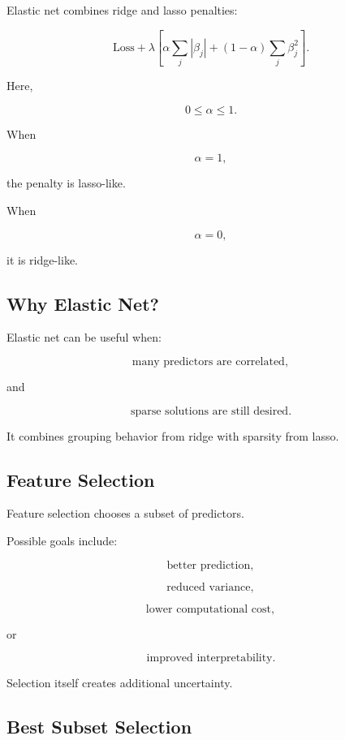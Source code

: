 Elastic net combines ridge and lasso penalties:

\[
\boxed{
\text{Loss}
+
\lambda
\left[
\alpha
\sum_j|\beta_j|
+
(1-\alpha)
\sum_j\beta_j^2
\right].
}
\]

Here,

\[
\boxed{
0\leq\alpha\leq1.
}
\]

When

\[
\alpha=1,
\]

the penalty is lasso-like.

When

\[
\alpha=0,
\]

it is ridge-like.

\subsection{Why Elastic Net?}
\label{subsec:why-elastic-net}

Elastic net can be useful when:

\[
\boxed{
\text{many predictors are correlated},
}
\]

and

\[
\boxed{
\text{sparse solutions are still desired}.
}
\]

It combines grouping behavior from ridge with sparsity from lasso.

\subsection{Feature Selection}
\label{subsec:feature-selection}

Feature selection chooses a subset of predictors.

Possible goals include:

\[
\boxed{
\text{better prediction},
}
\]

\[
\boxed{
\text{reduced variance},
}
\]

\[
\boxed{
\text{lower computational cost},
}
\]

or

\[
\boxed{
\text{improved interpretability}.
}
\]

Selection itself creates additional uncertainty.

\subsection{Best Subset Selection}
\label{subsec:best-subset-selection}

